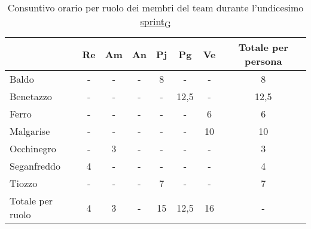 \begin{table}[!h]
    \centering
    \begin{tabular}{ | l | c | c | c | c | c | c | c | }
        \hline
        \textbf{} & \textbf{Re} & \textbf{Am} &\textbf{An} & \textbf{Pj} & \textbf{Pg} & \textbf{Ve} & \textbf{Totale per persona} \\
        \hline
        Baldo            &  -   &  -   &  -   &  8   &  -   &  -   &  8   \\
        Benetazzo        &  -   &  -   &  -   &  -   & 12,5 &  -   & 12,5 \\
        Ferro            &  -   &  -   &  -   &  -   &  -   &  6   &  6   \\
        Malgarise        &  -   &  -   &  -   &  -   &  -   & 10   & 10   \\
        Occhinegro       &  -   &  3   &  -   &  -   &  -   &  -   &  3   \\
        Seganfreddo      &  4   &  -   &  -   &  -   &  -   &  -   &  4   \\
        Tiozzo           &  -   &  -   &  -   &  7   &  -   &  -   &  7   \\
        \hline
        Totale per ruolo &  4   &  3   &  -   & 15   & 12,5 & 16   &  -   \\
        \hline
    \end{tabular}
    \caption{Consuntivo orario per ruolo dei membri del team durante l'undicesimo \href{https://7last.github.io/docs/rtb/documentazione-interna/glossario\#sprint}{sprint\textsubscript{G}}}
\end{table}

